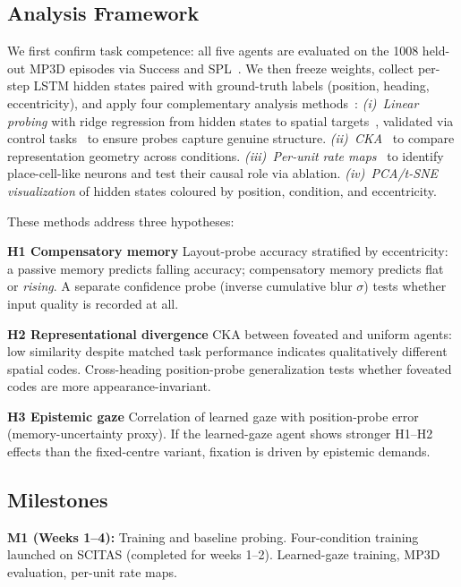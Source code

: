 \documentclass[10pt,conference,compsocconf]{IEEEtran}
\begin{document}
\subsection{Analysis Framework}

We first confirm task competence: all five agents are evaluated on the 1008 held-out MP3D episodes via Success and SPL~\cite{anderson2018spl}. We then freeze weights, collect per-step LSTM hidden states paired with ground-truth labels (position, heading, eccentricity), and apply four complementary analysis methods~\cite{belinkov2022probing}:
\emph{(i)~Linear probing} with ridge regression from hidden states to spatial targets~\cite{wijmans2023emergence}, validated via control tasks~\cite{hewitt2019control} to ensure probes capture genuine structure.
\emph{(ii)~CKA}~\cite{kornblith2019cka} to compare representation geometry across conditions.
\emph{(iii)~Per-unit rate maps}~\cite{banino2018grid} to identify place-cell-like neurons and test their causal role via ablation.
\emph{(iv)~PCA/t-SNE visualization} of hidden states coloured by position, condition, and eccentricity.

These methods address three hypotheses:

\noindent\textbf{H1 Compensatory memory} Layout-probe accuracy stratified by eccentricity: a passive memory predicts falling accuracy; compensatory memory predicts flat or \emph{rising}. A separate confidence probe (inverse cumulative blur $\sigma$) tests whether input quality is recorded at all.

\noindent\textbf{H2 Representational divergence} CKA between foveated and uniform agents: low similarity despite matched task performance indicates qualitatively different spatial codes. Cross-heading position-probe generalization tests whether foveated codes are more appearance-invariant.

\noindent\textbf{H3 Epistemic gaze} Correlation of learned gaze with position-probe error (memory-uncertainty proxy). If the learned-gaze agent shows stronger H1--H2 effects than the fixed-centre variant, fixation is driven by epistemic demands.

\subsection{Milestones}

\noindent\textbf{M1 (Weeks 1--4):} Training and baseline probing. Four-condition training launched on SCITAS (completed for weeks 1--2). Learned-gaze training, MP3D evaluation, per-unit rate maps.
\end{document}
